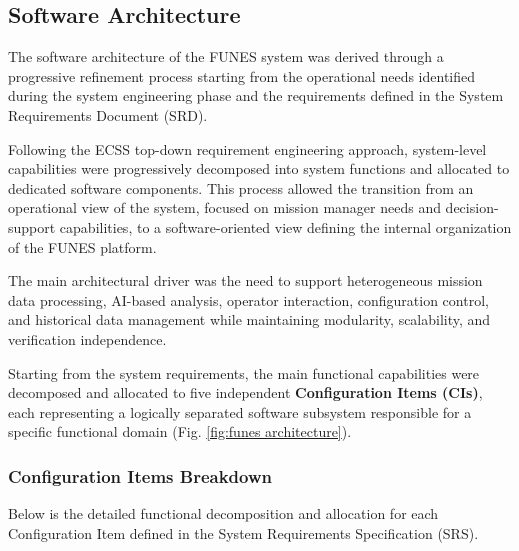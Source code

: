 \subsection{Software Architecture} \label{sec:software architecture}

The software architecture of the FUNES system was derived through a progressive refinement process starting from the operational needs identified during the system engineering phase and the requirements defined in the System Requirements Document (SRD).

Following the ECSS top-down requirement engineering approach, system-level capabilities were progressively decomposed into system functions and allocated to dedicated software components. This process allowed the transition from an operational view of the system, focused on mission manager needs and decision-support capabilities, to a software-oriented view defining the internal organization of the FUNES platform.

The main architectural driver was the need to support heterogeneous mission data processing, AI-based analysis, operator interaction, configuration control, and historical data management while maintaining modularity, scalability, and verification independence.

Starting from the system requirements, the main functional capabilities were decomposed and allocated to five independent \textbf{Configuration Items (CIs)}, each representing a logically separated software subsystem responsible for a specific functional domain (Fig. \ref{fig:funes architecture}).


\subsubsection{Configuration Items Breakdown}

Below is the detailed functional decomposition and allocation for each Configuration Item defined in the System Requirements Specification (SRS).

